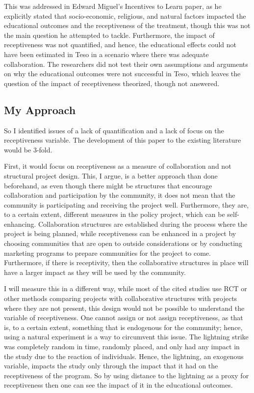 \documentclass{article}
\begin{document}
This was addressed in Edward Miguel's Incentives to Learn paper, as he explicitly stated that socio-economic, religious, and natural factors impacted the educational outcomes and the receptiveness of the treatment, though this was not the main question he attempted to tackle.\autocite[]{kremer-miguel-thornton-2009} Furthermore, the impact of receptiveness was not quantified, and hence, the educational effects could not have been estimated in Teso in a scenario where there was adequate collaboration. The researchers did not test their own assumptions and arguments on why the educational outcomes were not successful in Teso, which leaves the question of the impact of receptiveness theorized, though not answered.

\subsection{My Approach}
So I identified issues of a lack of quantification and a lack of focus on the receptiveness variable. The development of this paper to the existing literature would be 3-fold. 

First, it would focus on receptiveness as a measure of collaboration and not structural project design. This, I argue, is a better approach than done beforehand, as even though there might be structures that encourage collaboration and participation by the community, it does not mean that the community is participating and receiving the project well. Furthermore, they are, to a certain extent, different measures in the policy project, which can be self-enhancing. Collaboration structures are established during the process where the project is being planned, while receptiveness can be enhanced in a project by choosing communities that are open to outside considerations or by conducting marketing programs to prepare communities for the project to come. Furthermore, if there is receptivity, then the collaborative structures in place will have a larger impact as they will be used by the community. 

I will measure this in a different way, while most of the cited studies use RCT or other methods comparing projects with collaborative structures with projects where they are not present, this design would not be possible to understand the variable of receptiveness. One cannot assign or not assign receptiveness, as that is, to a certain extent, something that is endogenous for the community; hence, using a natural experiment is a way to circumvent this issue. The lightning strike was completely random in time, randomly placed, and only had any impact in the study due to the reaction of individuals. Hence, the lightning, an exogenous variable, impacts the study only through the impact that it had on the receptiveness of the program. So by using distance to the lightning as a proxy for receptiveness then one can see the impact of it in the educational outcomes. 
\end{document}
